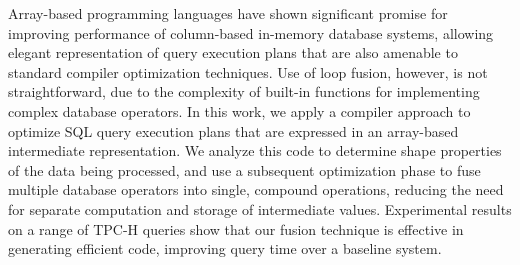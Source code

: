 Array-based programming languages have shown significant promise for
improving performance of column-based in-memory database systems,
allowing elegant representation of query execution plans that are
also amenable to standard compiler optimization techniques.
Use of loop fusion, however, is not straightforward, due to the
complexity of built-in functions for implementing complex database operators.
In this work, we apply a compiler approach to optimize SQL query execution
plans that are expressed in an array-based intermediate representation. We
analyze this code to 
determine shape properties of the data being
processed, and use a subsequent optimization phase to fuse multiple database
operators into single, compound operations, reducing the need for separate
computation and storage of intermediate values.  Experimental results on a
range of TPC-H queries show that our fusion technique is effective in
generating efficient code, improving query time over a baseline system.




